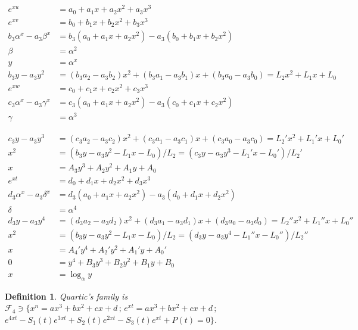 \documentclass[12pt,a4paper]{article}
\newtheorem{definition}{Definition}[section]
\begin{document}
\begin{align}
e^{xu} &= a_0 + a_1 x + a_2 x^2 + a_3 x^3 \\
e^{xv} &= b_0 + b_1 x + b_2 x^2 + b_3 x^3 \\
b_3 \alpha^x - a_3 \beta^x &= b_3 (a_0 + a_1 x + a_2 x^2) - a_3 (b_0 + b_1 x + b_2 x^2) \\
\beta &= \alpha^2 \\
y &= \alpha^x \\
b_3 y - a_3 y^2 &= (b_3 a_2 - a_3 b_2) x^2 + (b_3 a_1 - a_3 b_1)x + (b_3 a_0 - a_3 b_0) = L_2 x^2 + L_1 x + L_0 \\
e^{xw} &= c_0 + c_1 x + c_2 x^2 + c_3 x^3 \\
c_3 \alpha^x - a_3 \gamma^x &= c_3 (a_0 + a_1 x + a_2 x^2) - a_3 (c_0 + c_1 x + c_2 x^2) \\
\gamma &= \alpha^3
\end{align}

\begin{align}
c_3 y - a_3 y^3 &= (c_3 a_2 - a_3 c_2) x^2 + (c_3 a_1 - a_3 c_1)x + (c_3 a_0 - a_3 c_0) = L_2' x^2 + L_1' x + L_0' \\
x^2 &= (b_3 y - a_3 y^2 - L_1 x - L_0)/L_2 = (c_3 y - a_3 y^3 - L_1' x - L_0')/L_2' \\
x &= A_3 y^3 + A_2 y^2 + A_1 y + A_0 \\
e^{xt} &= d_0 + d_1 x + d_2 x^2 + d_3 x^3 \\
d_3 \alpha^x - a_3 \delta^x &= d_3 (a_0 + a_1 x + a_2 x^2) - a_3 (d_0 + d_1 x + d_2 x^2) \\
\delta &= \alpha^4 \\
d_3 y - a_3 y^4 &= (d_3 a_2 - a_3 d_2) x^2 + (d_3 a_1 - a_3 d_1)x + (d_3 a_0 - a_3 d_0) = L_2'' x^2 + L_1'' x + L_0'' \\
x^2 &= (b_3 y - a_3 y^2 - L_1 x - L_0)/L_2 = (d_3 y - a_3 y^4 - L_1'' x - L_0'')/L_2'' \\
x &= A_4' y^4 + A_2' y^2 + A_1' y + A_0' \\
0 &= y^4 + B_3 y^3 + B_2 y^2 + B_1 y + B_0 \\
x &= \log_{\alpha} y
\end{align}

\begin{definition}
Quartic's family is $\mathcal{F}_4 \ni \{ x^n = ax^3 + bx^2 + cx + d\,;\,e^{xt} = ax^3 + bx^2 + cx + d\,;\,$ \\
$e^{4xt} - S_1(t) e^{3xt} + S_2(t) e^{2xt} - S_3(t) e^{xt} + P(t) = 0 \}$.
\end{definition}
\end{document}
